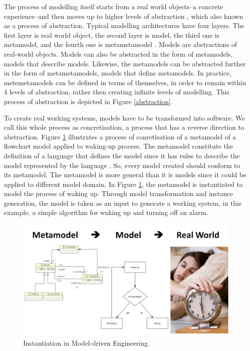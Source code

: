 \documentclass[12pt, a4paper]{report}
\begin{document}
{The process of modelling itself starts from a real world objects--a concrete experience--and then moves up to higher levels of abstraction \cite{white2010teaching, engels2005teaching}, which also known as a process of abstraction. Typical modelling architectures have four layers. The first layer is real world object, the second layer is model, the third one is metamodel, and the fourth one is metametamodel \cite{brambilla2012model}. Models are abstractions of real-world objects. Models can also be abstracted in the form of metamodels, models that describe models. Likewise, the metamodels can be abstracted further in the form of metametamodels, models that define metamodels. In practice, metemetamodels can be defined in terms of themselves, in order to remain within 4 levels of abstraction, rather then creating infinite levels of modelling. This process of abstraction is depicted in Figure \ref{abstraction}.
 
To create real working systems, models have to be transformed into software. We call this whole process as concretisation, a process that has a reverse direction to abstraction. Figure \ref{concretisation} illustrates a process of conretisation of a metamodel of a flowchart model applied to waking-up process. The metamodel constitute the definition of a language that defines the model since it has rules to describe the model represented by the language \cite{brambilla2012model}. So, every model created should conform to its metamodel. The metamodel is more general than it is models since it could be applied to different model domain. In Figure \ref{concretisation}, the metamodel is instantiated to model the process of waking up. Through model transformation and instance generation, the model is taken as an input to generate a working system, in this example, a simple algorithm for waking up and turning off an alarm.   

\begin{figure}[!t]
\centering
\includegraphics[width=13cm]{concretisation}
\caption{Instantiation in Model-driven Engineering.}
\label{concretisation}
\end{figure}
   
}
\end{document}
